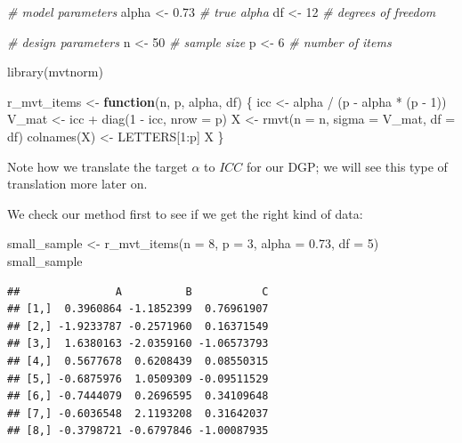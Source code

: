 \documentclass[
]{book}
\newenvironment{Shaded}{\begin{snugshade}}{\end{snugshade}}
\newcommand{\AttributeTok}[1]{\textcolor[rgb]{0.77,0.63,0.00}{#1}}
\newcommand{\CommentTok}[1]{\textcolor[rgb]{0.56,0.35,0.01}{\textit{#1}}}
\newcommand{\ControlFlowTok}[1]{\textcolor[rgb]{0.13,0.29,0.53}{\textbf{#1}}}
\newcommand{\DecValTok}[1]{\textcolor[rgb]{0.00,0.00,0.81}{#1}}
\newcommand{\FloatTok}[1]{\textcolor[rgb]{0.00,0.00,0.81}{#1}}
\newcommand{\FunctionTok}[1]{\textcolor[rgb]{0.00,0.00,0.00}{#1}}
\newcommand{\NormalTok}[1]{#1}
\newcommand{\OtherTok}[1]{\textcolor[rgb]{0.56,0.35,0.01}{#1}}
\newcommand{\SpecialCharTok}[1]{\textcolor[rgb]{0.00,0.00,0.00}{#1}}
\begin{document}
\begin{Shaded}
\begin{Highlighting}[]
\CommentTok{\# model parameters}
\NormalTok{alpha }\OtherTok{\textless{}{-}} \FloatTok{0.73} \CommentTok{\# true alpha}
\NormalTok{df }\OtherTok{\textless{}{-}} \DecValTok{12} \CommentTok{\# degrees of freedom}

\CommentTok{\# design parameters}
\NormalTok{n }\OtherTok{\textless{}{-}} \DecValTok{50} \CommentTok{\# sample size}
\NormalTok{p }\OtherTok{\textless{}{-}} \DecValTok{6} \CommentTok{\# number of items}


\FunctionTok{library}\NormalTok{(mvtnorm)}

\NormalTok{r\_mvt\_items }\OtherTok{\textless{}{-}} \ControlFlowTok{function}\NormalTok{(n, p, alpha, df) \{}
\NormalTok{  icc }\OtherTok{\textless{}{-}}\NormalTok{ alpha }\SpecialCharTok{/}\NormalTok{ (p }\SpecialCharTok{{-}}\NormalTok{ alpha }\SpecialCharTok{*}\NormalTok{ (p }\SpecialCharTok{{-}} \DecValTok{1}\NormalTok{))}
\NormalTok{  V\_mat }\OtherTok{\textless{}{-}}\NormalTok{ icc }\SpecialCharTok{+} \FunctionTok{diag}\NormalTok{(}\DecValTok{1} \SpecialCharTok{{-}}\NormalTok{ icc, }\AttributeTok{nrow =}\NormalTok{ p)}
\NormalTok{  X }\OtherTok{\textless{}{-}} \FunctionTok{rmvt}\NormalTok{(}\AttributeTok{n =}\NormalTok{ n, }\AttributeTok{sigma =}\NormalTok{ V\_mat, }\AttributeTok{df =}\NormalTok{ df)}
  \FunctionTok{colnames}\NormalTok{(X) }\OtherTok{\textless{}{-}}\NormalTok{ LETTERS[}\DecValTok{1}\SpecialCharTok{:}\NormalTok{p]}
\NormalTok{  X}
\NormalTok{\}}
\end{Highlighting}
\end{Shaded}

Note how we translate the target \(\alpha\) to \(ICC\) for our DGP; we will see this type of translation more later on.

We check our method first to see if we get the right kind of data:

\begin{Shaded}
\begin{Highlighting}[]
\NormalTok{small\_sample }\OtherTok{\textless{}{-}} \FunctionTok{r\_mvt\_items}\NormalTok{(}\AttributeTok{n =} \DecValTok{8}\NormalTok{, }\AttributeTok{p =} \DecValTok{3}\NormalTok{, }\AttributeTok{alpha =} \FloatTok{0.73}\NormalTok{, }\AttributeTok{df =} \DecValTok{5}\NormalTok{)}
\NormalTok{small\_sample}
\end{Highlighting}
\end{Shaded}

\begin{verbatim}
##               A          B           C
## [1,]  0.3960864 -1.1852399  0.76961907
## [2,] -1.9233787 -0.2571960  0.16371549
## [3,]  1.6380163 -2.0359160 -1.06573793
## [4,]  0.5677678  0.6208439  0.08550315
## [5,] -0.6875976  1.0509309 -0.09511529
## [6,] -0.7444079  0.2696595  0.34109648
## [7,] -0.6036548  2.1193208  0.31642037
## [8,] -0.3798721 -0.6797846 -1.00087935
\end{verbatim}
\end{document}
